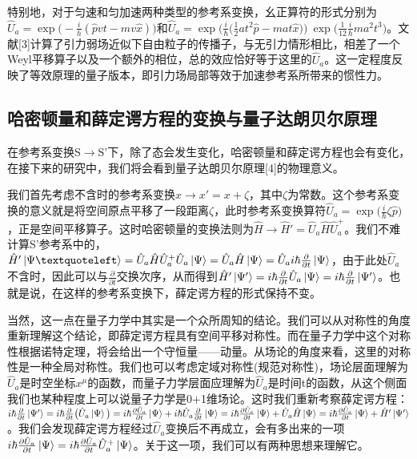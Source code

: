 \documentclass[a4paper]{article}
\begin{document}
        特别地，对于匀速和匀加速两种类型的参考系变换，幺正算符的形式分别为$\hat{U}_a=\exp\big(-\frac{i}{h}(\hat{p}vt-mv\hat{x})\big)$和$\hat{U}_a=\exp\big(\frac{i}{\hbar}\big(\frac{1}{2}at^2\hat{p}-mat\hat{x} \big)\big)\ \exp\big(\frac{1}{12}\frac{i}{\hbar}ma^2t^3\big)$。文献[3]计算了引力弱场近似下自由粒子的传播子，与无引力情形相比，相差了一个Weyl平移算子以及一个额外的相位，总的效应恰好等于这里的$\hat{U}_a$。这一定程度反映了等效原理的量子版本，即引力场局部等效于加速参考系所带来的惯性力。

        \subsection{哈密顿量和薛定谔方程的变换与量子达朗贝尔原理}

            在参考系变换S$\rightarrow$S'下，除了态会发生变化，哈密顿量和薛定谔方程也会有变化，在接下来的研究中，我们将会看到量子达朗贝尔原理[4]的物理意义。

            我们首先考虑不含时的参考系变换$x\rightarrow x'=x+\zeta$，其中$\zeta$为常数。这个参考系变换的意义就是将空间原点平移了一段距离$\zeta$，此时参考系变换算符$\hat{U}_a=\exp\big(\frac{i}{\hbar}\zeta\hat{p} \big)$，正是空间平移算子。这时哈密顿量的变换法则为$\hat{H}\rightarrow \hat{H}'=\hat{U}_a\hat{H}\hat{U}_a^+$。我们不难计算S'参考系中的，$\hat{H}'\ket{\Psi‘}=\hat{U}_a\hat{H}\hat{U}_a^+\hat{U}_a\ket{\Psi}=\hat{U}_a\hat{H}\ket{\Psi}=\hat{U}_a i\hbar\frac{\partial}{\partial t}\ket{\Psi}$，由于此处$\hat{U}_a$不含时，因此可以与$\frac{\partial}{\partial t}$交换次序，从而得到$\hat{H}'\ket{\Psi'}=i\hbar\frac{\partial}{\partial t}\hat{U}_a\ket{\Psi}=i\hbar\frac{\partial}{\partial t}\ket{\Psi'}$。也就是说，在这样的参考系变换下，薛定谔方程的形式保持不变。

            当然，这一点在量子力学中其实是一个众所周知的结论。我们可以从对称性的角度重新理解这个结论，即薛定谔方程具有空间平移对称性。而在量子力学中这个对称性根据诺特定理，将会给出一个守恒量——动量。从场论的角度来看，这里的对称性是一种全局对称性。我们也可以考虑定域对称性(规范对称性)，场论层面理解为$\hat{U}_a$是时空坐标$x^\mu$的函数，而量子力学层面应理解为$\hat{U}_a$是时间t的函数，从这个侧面我们也某种程度上可以说量子力学是0+1维场论。这时我们重新考察薛定谔方程：$i\hbar\frac{\partial}{\partial t}\ket{\Psi'} = i\hbar\frac{\partial}{\partial t}\big(\hat{U}_a\ket{\Psi}\big) = i\hbar\frac{\partial\hat{U}_a}{\partial t}\ket{\Psi} + i\hbar\hat{U}_a\frac{\partial}{\partial t}\ket{\Psi} = i\hbar\frac{\partial\hat{U}_a}{\partial t}\ket{\Psi} + \hat{U}_a\hat{H}\ket{\Psi} = i\hbar\frac{\partial\hat{U}_a}{\partial t}\ket{\Psi} + \hat{H}'\ket{\Psi'}$。我们会发现薛定谔方程经过$\hat{U}_a$变换后不再成立，会有多出来的一项$i\hbar\frac{\partial\hat{U}_a}{\partial t}\ket{\Psi} = i\hbar\frac{\partial\hat{U}_a}{\partial t}\hat{U}_a^+\ket{\Psi}$。关于这一项，我们可以有两种思想来理解它。
\end{document}
